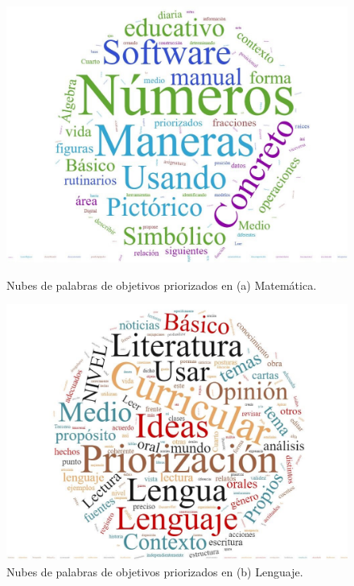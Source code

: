 \documentclass[spanish]{textolivre}
\begin{document}
\begin{figure}[htbp]
 \centering
 \begin{minipage}{.45\textwidth}
 \includegraphics[width=\textwidth]{fig-002a.jpeg.jpg}
 \caption{Nubes de palabras de objetivos priorizados en (a) Matemática.}
 \label{fig2a}
 \end{minipage}%
 \qquad
 \begin{minipage}{0.45\textwidth}
 \includegraphics[width=\textwidth]{fig-002b.jpeg.jpg}
 \caption{Nubes de palabras de objetivos priorizados en (b) Lenguaje.}
 \label{fig2b}
 \end{minipage}%
\end{figure}
\end{document}
